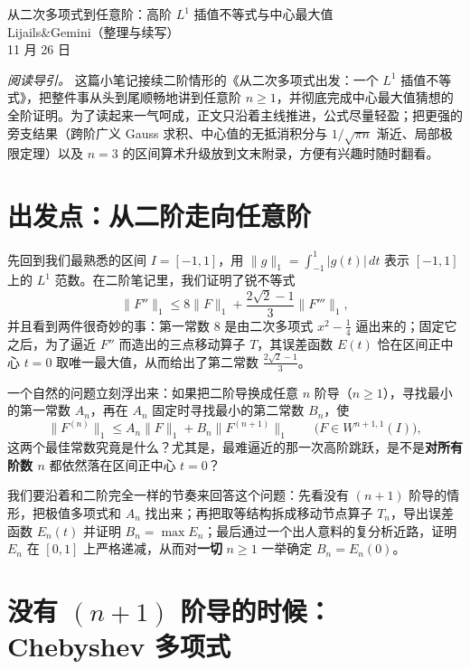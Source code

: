 \documentclass[UTF8,fontset=windows,a4paper,11pt]{ctexart}
\newcommand{\Lone}[1]{\lVert #1\rVert_1}
\begin{document}
\begin{center}
    \Large 从二次多项式到任意阶：高阶 $L^1$ 插值不等式与中心最大值\\[6pt]
    \normalsize Lijails\quad \&\quad Gemini（整理与续写）\\[2pt]
    11 月 26 日
\end{center}

\medskip
\noindent\textit{阅读导引。} 这篇小笔记接续二阶情形的《从二次多项式出发：一个 $L^1$ 插值不等式》，把整件事从头到尾顺畅地讲到任意阶 $n\ge 1$，并彻底完成中心最大值猜想的全阶证明。为了读起来一气呵成，正文只沿着主线推进，公式尽量轻盈；把更强的旁支结果（跨阶广义 Gauss 求积、中心值的无抵消积分与 $1/\sqrt{\pi n}$ 渐近、局部极限定理）以及 $n=3$ 的区间算术升级放到文末附录，方便有兴趣时随时翻看。

\section{出发点：从二阶走向任意阶}

先回到我们最熟悉的区间 $I=[-1,1]$，用 $\Lone{g}=\int_{-1}^{1}|g(t)|\,dt$ 表示 $[-1,1]$ 上的 $L^1$ 范数。在二阶笔记里，我们证明了锐不等式
\begin{equation}
    \Lone{F''}\le 8\Lone{F}+\frac{2\sqrt{2}-1}{3}\Lone{F'''},
    \label{eq:n2}
\end{equation}
并且看到两件很奇妙的事：第一常数 $8$ 是由二次多项式 $x^2-\frac14$ 逼出来的；固定它之后，为了逼近 $F''$ 而造出的三点移动算子 $T$，其误差函数 $E(t)$ 恰在区间正中心 $t=0$ 取唯一最大值，从而给出了第二常数 $\frac{2\sqrt{2}-1}{3}$。

一个自然的问题立刻浮出来：如果把二阶导换成任意 $n$ 阶导（$n\ge 1$），寻找最小的第一常数 $A_n$，再在 $A_n$ 固定时寻找最小的第二常数 $B_n$，使
\begin{equation}
    \Lone{F^{(n)}}\le A_n\Lone{F}+B_n\Lone{F^{(n+1)}}
    \qquad \bigl(F\in W^{n+1,1}(I)\bigr),
    \label{eq:main}
\end{equation}
这两个最佳常数究竟是什么？尤其是，最难逼近的那一次高阶跳跃，是不是\textbf{对所有阶数 $n$} 都依然落在区间正中心 $t=0$？

我们要沿着和二阶完全一样的节奏来回答这个问题：先看没有 $(n+1)$ 阶导的情形，把极值多项式和 $A_n$ 找出来；再把取等结构拆成移动节点算子 $T_n$，导出误差函数 $E_n(t)$ 并证明 $B_n=\max E_n$；最后通过一个出人意料的复分析近路，证明 $E_n$ 在 $[0,1]$ 上严格递减，从而对\textbf{一切} $n\ge 1$ 一举确定 $B_n=E_n(0)$。

\section{没有 $(n+1)$ 阶导的时候：Chebyshev 多项式}
\label{sec:poly}
\end{document}
